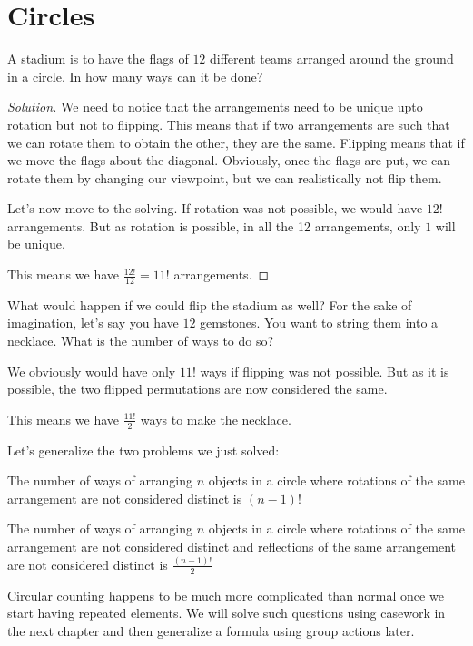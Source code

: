 \section{Circles}
\begin{example}
A stadium is to have the flags of $12$ different teams arranged around the ground in a circle. 
In how many ways can it be done?  
\end{example}
\begin{proof}
    [Solution]
    We need to notice that the arrangements need to be unique upto rotation but not to flipping. 
    This means that if two arrangements are such that we can rotate them to obtain the other, 
    they are the same. Flipping means that if we move the flags about the diagonal. Obviously, 
    once the flags are put, we can rotate them by changing our viewpoint, but we can realistically 
    not flip them.\par
    Let's now move to the solving. If rotation was not possible, we would have $12!$ arrangements. 
    But as rotation is possible, in all the 12 arrangements, only $1$ will be unique.\par
    This means we have $\frac{12!}{12}=11!$ arrangements.
\end{proof}
What would happen if we could flip the stadium as well? For the sake of imagination, 
let's say you have $12$ gemstones. You want to string them into a necklace. 
What is the number of ways to do so?\par
We obviously would have only $11!$ ways if flipping was not possible. But as it is possible, 
the two flipped permutations are now considered the same.\par
This means we have $\frac{11!}{2}$ ways to make the necklace.\par
Let's generalize the two problems we just solved:
\begin{theorem}
The number of ways of arranging $n$ objects in a circle where rotations of the same 
arrangement are not considered distinct is $(n - 1)!$
\end{theorem}
\begin{theorem}
The number of ways of arranging $n$ objects in a circle where 
rotations of the same arrangement are not considered distinct and reflections 
of the same arrangement are not considered distinct is $\frac{(n-1)!}{2}$
\end{theorem}
Circular counting happens to be much more complicated than normal once we start having repeated elements. 
We will solve such questions using casework in the next chapter and then generalize a formula using group 
actions later.\par
